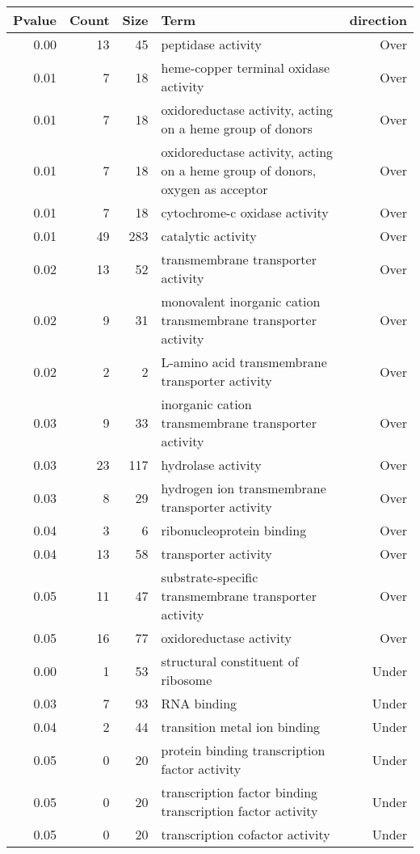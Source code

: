 \documentclass[10pt]{bmc_article}
\newenvironment{bmcformat}{\begin{raggedright}\baselineskip20pt\sloppy\setboolean{publ}{false}}{\end{raggedright}\baselineskip20pt\sloppy}
\begin{document}
\begin{bmcformat}
\begin{longtable}{rrrp{4cm}r}
 Pvalue & Count & Size & Term & direction \\ 
  \hline
0.00 &  13 &  45 & peptidase activity & Over \\ 
  0.01 &   7 &  18 & heme-copper terminal oxidase activity & Over \\ 
  0.01 &   7 &  18 & oxidoreductase activity, acting on a heme group of donors & Over \\ 
  0.01 &   7 &  18 & oxidoreductase activity, acting on a heme group of donors, oxygen as acceptor & Over \\ 
  0.01 &   7 &  18 & cytochrome-c oxidase activity & Over \\ 
  0.01 &  49 & 283 & catalytic activity & Over \\ 
  0.02 &  13 &  52 & transmembrane transporter activity & Over \\ 
  0.02 &   9 &  31 & monovalent inorganic cation transmembrane transporter activity & Over \\ 
  0.02 &   2 &   2 & L-amino acid transmembrane transporter activity & Over \\ 
  0.03 &   9 &  33 & inorganic cation transmembrane transporter activity & Over \\ 
  0.03 &  23 & 117 & hydrolase activity & Over \\ 
  0.03 &   8 &  29 & hydrogen ion transmembrane transporter activity & Over \\ 
  0.04 &   3 &   6 & ribonucleoprotein binding & Over \\ 
  0.04 &  13 &  58 & transporter activity & Over \\ 
  0.05 &  11 &  47 & substrate-specific transmembrane transporter activity & Over \\ 
  0.05 &  16 &  77 & oxidoreductase activity & Over \\ 
  0.00 &   1 &  53 & structural constituent of ribosome & Under \\ 
  0.03 &   7 &  93 & RNA binding & Under \\ 
  0.04 &   2 &  44 & transition metal ion binding & Under \\ 
  0.05 &   0 &  20 & protein binding transcription factor activity & Under \\ 
  0.05 &   0 &  20 & transcription factor binding transcription factor activity & Under \\ 
  0.05 &   0 &  20 & transcription cofactor activity & Under \\ 

\end{longtable}
\end{bmcformat}
\end{document}
